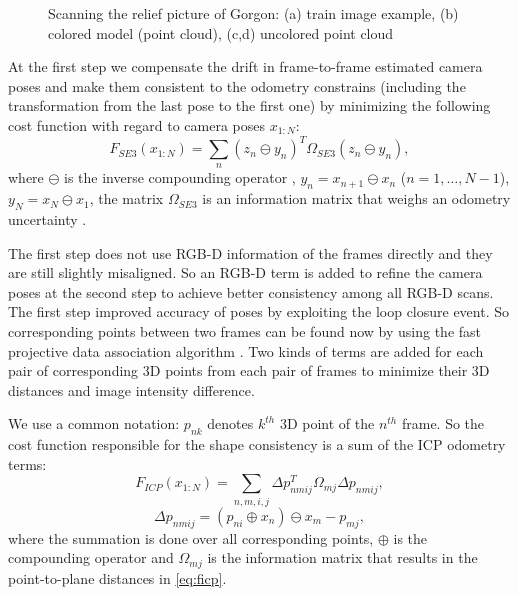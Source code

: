 \documentclass[letterpaper, 10 pt, conference]{ieeeconf}  %
\begin{document}
\begin{figure}[t]
\begin{subfigure}[b]{0.45\linewidth}
                \caption{}
        \end{subfigure}
        \caption{Scanning the relief picture of Gorgon: (a) train image example,
        (b) colored model (point cloud), (c,d) uncolored point cloud}
        \label{fig:gorgon}
\end{figure}

At the first step we compensate the drift in frame-to-frame estimated camera poses and 
make them consistent to the odometry constrains (including the transformation from the last pose
to the first one) by minimizing the following cost function
with regard to camera poses $x_{1:N}$:
\begin{equation} \label{eq:ffirst}
F_{SE3}(x_{1:N}) = \sum_n (z_n \ominus y_n)^T \Omega_{SE3} (z_n \ominus y_n),
\end{equation}
where $\ominus$ is the inverse compounding operator \cite{lu1997globally},
$y_n=x_{n+1} \ominus x_{n}$ ($n=1,\dots, N-1$), $y_N=x_N \ominus x_1$,
the matrix $\Omega_{SE3}$ is an information matrix that weighs an odometry uncertainty \cite{kuemmerle2011g2o}.

The first step does not use RGB-D information of the frames directly and they are
still slightly misaligned. So an RGB-D term is added to refine the camera poses at the second step 
to achieve better consistency among all RGB-D scans.
The first step improved accuracy of poses by exploiting the loop closure event.
So corresponding points between two frames can be found now by using
the fast projective data association algorithm \cite{rusinkiewicz2001efficient}.
Two kinds of terms are added for each pair of corresponding 3D points from each pair of frames
to minimize their 3D distances and image intensity difference.

We use a common notation: $p_{nk}$ denotes $k^{th}$ 3D point of 
the $n^{th}$ frame. So the cost function responsible for the shape consistency is
a sum of the ICP odometry terms:
\begin{equation} \label{eq:ficp}
    F_{ICP}(x_{1:N}) = \sum_{n,m,i,j} \Delta p_{nmij}^T \Omega_{mj} \Delta p_{nmij},
\end{equation}
\begin{equation}
    \Delta p_{nmij}=(p_{ni} \oplus x_n) \ominus x_m - p_{mj},
\end{equation}
where the summation is done over all corresponding points, $\oplus$ is 
the compounding operator \cite{lu1997globally} and $\Omega_{mj}$ is 
the information matrix that results in the point-to-plane 
distances in \eqref{eq:ficp}.
\end{document}
